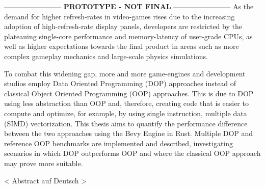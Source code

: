 
\cleardoubleoddpage
\begin{abstract*}
------------------------ \textbf{PROTOTYPE - NOT FINAL} ------------------------  \break
As the demand for higher refresh-rates in video-games rises due to the increasing adoption of high-refresh-rate display panels, developers are restricted by the plateauing single-core performance and memory-latency of user-grade CPUs, as well as higher expectations towards the final product in areas such as more complex gameplay mechanics and large-scale physics simulations. 

To combat this widening gap, more and more game-engines and development studios employ Data Oriented Programming (DOP) approaches instead of classical Object Oriented Programming (OOP) approaches. This is due to DOP using less abstraction than OOP and, therefore, creating code that is easier to compute and optimize, for example, by using single instruction, multiple data (SIMD) vectorization. This thesis aims to quantify the performance difference between the two approaches using the Bevy Engine in Rust. Multiple DOP and  reference OOP benchmarks are implemented and described, investigating scenarios in which DOP outperforms OOP and where the classical OOP approach may prove more suitable. 
\end{abstract*}


\cleardoubleoddpage
\begin{otherlanguage}{ngerman}
\begin{abstract*}
< Abstract auf Deutsch >
\end{abstract*}
\end{otherlanguage}

